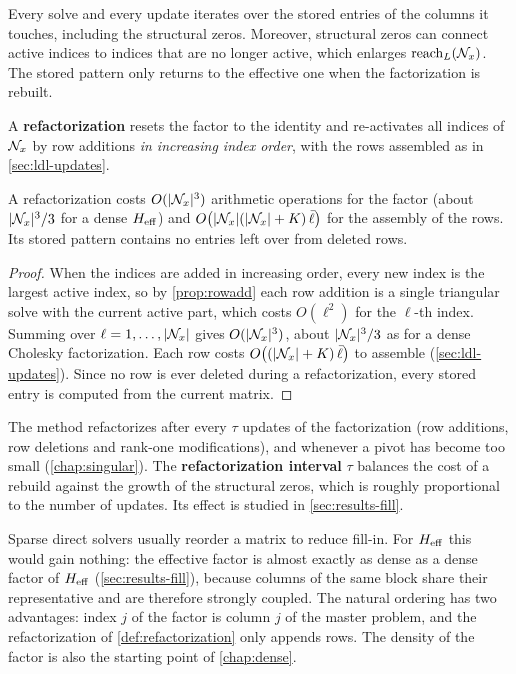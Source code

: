 Every solve and every update iterates over the stored entries of the columns it touches,
including the structural zeros. Moreover, structural zeros can connect active indices to
indices that are no longer active, which enlarges $\operatorname{reach}_L(\mathcal{N}_x)$. The stored pattern only
returns to the effective one when the factorization is rebuilt.

\begin{definition}[Refactorization] \label{def:refactorization}
A \textbf{refactorization} resets the factor to the identity and re-activates all indices of
$\mathcal{N}_x$ by row additions \emph{in increasing index order}, with the rows assembled as in
\cref{sec:ldl-updates}.
\end{definition}

\begin{prop} \label{prop:refactor-cost}
A refactorization costs $O(|\mathcal{N}_x|^3)$ arithmetic operations for the factor (about
$|\mathcal{N}_x|^3/3$ for a dense $H_{\mathrm{eff}}$) and $O\bigl(|\mathcal{N}_x|(|\mathcal{N}_x|+K)\,\bar\ell\bigr)$ for the assembly of
the rows. Its stored pattern contains no entries left over from deleted rows.
\end{prop}

\begin{proof}
When the indices are added in increasing order, every new index is the largest active index,
so by \cref{prop:rowadd} each row addition is a single triangular solve with the current
active part, which costs $O(\ell^2)$ for the $\ell$-th index. Summing over $\ell = 1,\dots,|\mathcal{N}_x|$ gives
$O(|\mathcal{N}_x|^3)$, about $|\mathcal{N}_x|^3/3$ as for a dense Cholesky factorization. Each row costs
$O\bigl((|\mathcal{N}_x|+K)\,\bar\ell\bigr)$ to assemble (\cref{sec:ldl-updates}). Since no row is ever
deleted during a refactorization, every stored entry is computed from the current matrix.
\end{proof}

The method refactorizes after every $\tau$ updates of the factorization (row additions, row
deletions and rank-one modifications), and whenever a pivot has become too small
(\cref{chap:singular}). The \textbf{refactorization interval} $\tau$ balances the cost of a
rebuild against the growth of the structural zeros, which is roughly proportional to the number
of updates. Its effect is studied in \cref{sec:results-fill}.

\begin{remark} \label{rem:natural-ordering}
Sparse direct solvers usually reorder a matrix to reduce fill-in. For $H_{\mathrm{eff}}$ this would gain
nothing: the effective factor is almost exactly as dense as a dense factor of $H_{\mathrm{eff}}$
(\cref{sec:results-fill}), because columns of the same block share their representative and
are therefore strongly coupled. The natural ordering has two advantages: index $j$ of the
factor is column $j$ of the master problem, and the refactorization of
\cref{def:refactorization} only appends rows. The density of the factor is also the starting
point of \cref{chap:dense}.
\end{remark}



